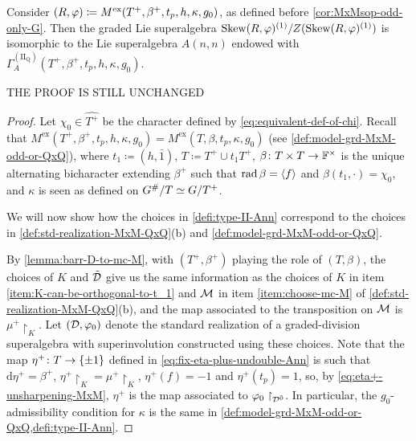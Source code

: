 \begin{prop}\label{prop:Ann-Type-II-correspondence}
    Consider $(R, \varphi) \coloneqq M^{\mathrm{ex}}(T^+, \beta^+, t_p, h, \kappa, g_0)$, as defined before \cref{cor:MxMsop-odd-only-G}. 
    Then the graded Lie superalgebra $\operatorname{Skew} (R,\varphi)^{(1)}/Z(\operatorname{Skew} (R,\varphi)^{(1)})$ is isomorphic to the Lie superalgebra $A(n,n)$ endowed with $\Gamma_A^{\mathrm{(II_Q)}}(T^+, \beta^+, t_p, h, \kappa, g_0)$. 
\end{prop}

THE PROOF IS STILL UNCHANGED

\begin{proof}
    Let $\chi_0 \in \widehat{T^+}$ be the character defined by \cref{eq:equivalent-def-of-chi}. 
    Recall that $M^{\mathrm{ex}}(T^+, \beta^+, t_p, h, \kappa, g_0) = M^{\mathrm{ex}} (T, \beta, t_p, \kappa, g_0)$ (see \cref{def:model-grd-MxM-odd-or-QxQ}), where $t_1 \coloneqq (h, \bar 1)$, $T \coloneqq T^+ \cup t_1 T^+$, $\beta\colon T\times T \to \mathbb{F}^\times$ is the unique alternating bicharacter extending $\beta^+$ such that $\operatorname{rad} \beta = \langle f \rangle$ and $\beta(t_1, \cdot) = \chi_0$, and $\kappa$ is seen as defined on $G^\#/T \simeq G/ T^+$. 
    
    We will now show how the choices in \cref{defi:type-II-Ann}  correspond to the choices in \cref{def:std-realization-MxM-QxQ}(b) and \cref{def:model-grd-MxM-odd-or-QxQ}. 
    
    By \cref{lemma:barr-D-to-mc-M}, with $(T^+, \beta^+)$ playing the role of $(T, \beta)$, the choices of $K$ and $\tilde {\mathcal{D}}$  give us the same information as the choices of $K$ in item \eqref{item:K-can-be-orthogonal-to-t_1} and $\mathcal M$ in item \eqref{item:choose-mc-M} of \cref{def:std-realization-MxM-QxQ}(b), and the map associated to the transposition on $\mathcal M$ is $\mu^+\restriction_K$. 
    Let $(\mathcal{D}, \varphi_0)$ denote the standard realization of a graded-division superalgebra with superinvolution constructed using these choices. 
    Note that the map $\eta^+\colon T\to \{ \pm 1 \}$ defined in \cref{eq:fix-eta-plus-undouble-Ann} is such that $\mathrm{d}\eta^+ = \beta^+$, $\eta^+\restriction_{K} = \mu^+\restriction_K$, $\eta^+(f) = -1$ and $\eta^+(t_p) = 1$, so, by \cref{eq:eta+-unsharpening-MxM}, $\eta^+$ is the map associated to $\varphi_0\restriction_{\mathcal{D}^{\bar0}}$. 
    In particular, the $g_0$-admissibility condition for $\kappa$ is the same in \cref{def:model-grd-MxM-odd-or-QxQ,defi:type-II-Ann}. 
    

\end{proof}
